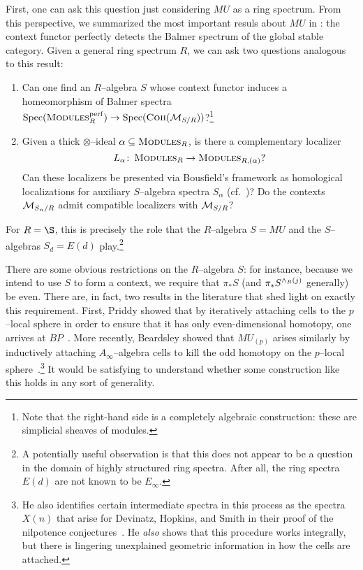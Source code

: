 First, one can ask this question just considering \(MU\) as a ring spectrum.  From this perspective, we summarized the most important resuls about \(MU\) in : the context functor perfectly detects the Balmer spectrum of the global stable category.  Given a general ring spectrum \(R\), we can ask two questions analogous to this result:
\begin{enumerate}
\item Can one find an \(R\)--algebra \(S\) whose context functor induces a homeomorphism of Balmer spectra \(\operatorname{Spec}(\normalfont\textsc{Modules}_R^{\mathrm{perf}}) \to \operatorname{Spec}(\normalfont\textsc{Coh}(\mathcal{M}_{S/R}))\)?\footnote{Note that the right-hand side is a completely algebraic construction: these are simplicial sheaves of modules.}
\item Given a thick \(\otimes\)--ideal \(\alpha \subseteq \normalfont\textsc{Modules}_R\), is there a complementary localizer \[L_\alpha\colon\thinspace \normalfont\textsc{Modules}_R \to \normalfont\textsc{Modules}_{R,(\alpha)}?\]  Can these localizers be presented via Bousfield's framework as homological localizations for auxiliary \(S\)--algebra spectra \(S_\alpha\) (cf.\ )?  Do the contexts \(\mathcal{M}_{S_\alpha/R}\) admit compatible localizers with \(\mathcal{M}_{S/R}\)?
\end{enumerate}
For \(R = \S\), this is precisely the role that the \(R\)--algebra \(S = MU\) and the \(S\)--algebras \(S_d = E(d)\) play.\footnote{A potentially useful observation is that this does not appear to be a question in the domain of highly structured ring spectra.  After all, the ring spectra \(E(d)\) are not known to be \(E_\infty\).}

There are some obvious restrictions on the \(R\)--algebra \(S\): for instance, because we intend to use \(S\) to form a context, we require that \(\pi_* S\) (and \(\pi_* S^{\wedge_R (j)}\) generally) be even.  There are, in fact, two results in the literature that shed light on exactly this requirement.  First, Priddy showed that by iteratively attaching cells to the \(p\)--local sphere in order to ensure that it has only even-dimensional homotopy, one arrives at \(BP\)~\cite{Priddy}.  More recently, Beardsley showed that \(MU_{(p)}\) arises similarly by inductively attaching \(A_\infty\)--algebra cells to kill the odd homotopy on the \(p\)--local sphere~\cite{Beardsley}.\footnote{He also identifies certain intermediate spectra in this process as the spectra \(X(n)\) that arise for Devinatz, Hopkins, and Smith in their proof of the nilpotence conjectures~\cite{DHS}.  He \emph{also} shows that this procedure works integrally, but there is lingering unexplained geometric information in how the cells are attached.}  It would be satisfying to understand whether some construction like this holds in any sort of generality.

